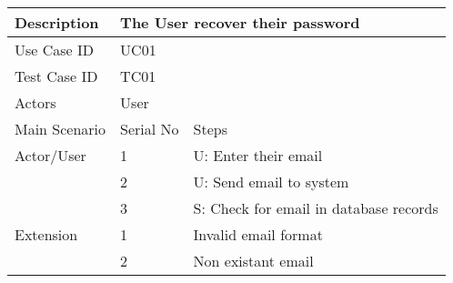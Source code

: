 \begin{table}[]
    \centering
    \begin{tabular}{|l|llll|}
        \hline
        Description   & \multicolumn{4}{l|}{The User recover their password}                                                               \\ \hline
        Use Case ID   & \multicolumn{4}{l|}{UC01}                                                                                          \\ \hline
        Test Case ID  & \multicolumn{4}{l|}{TC01}                                                                                          \\ \hline
        Actors        & \multicolumn{4}{l|}{User}                                                                                          \\ \hline
        Main Scenario & \multicolumn{1}{l|}{Serial No}                       & \multicolumn{3}{l|}{Steps}                                  \\ \hline
        Actor/User    & \multicolumn{1}{l|}{1}                               & \multicolumn{3}{l|}{U: Enter their email}                   \\ \hline
                      & \multicolumn{1}{l|}{2}                               & \multicolumn{3}{l|}{U: Send email to system}                \\ \hline
                      & \multicolumn{1}{l|}{3}                               & \multicolumn{3}{l|}{S: Check for email in database records} \\ \hline
        Extension     & \multicolumn{1}{l|}{1}                               & \multicolumn{3}{l|}{Invalid email format}                   \\ \hline
                      & \multicolumn{1}{l|}{2}                               & \multicolumn{3}{l|}{Non existant email}                     \\ \hline
    \end{tabular}
\end{table}

